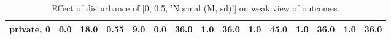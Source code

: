 \begin{table}
\begin{tabular}{l|cc|cc|cc|cc|cc|cc|cc}
private, 0 & \cellcolor{Bittersweet}0.0&\cellcolor{Bittersweet}18.0&\cellcolor{Bittersweet}0.55&\cellcolor{Bittersweet}9.0&\cellcolor{Bittersweet}0.0&\cellcolor{Bittersweet}36.0&\cellcolor{Bittersweet}1.0&\cellcolor{Bittersweet}36.0&\cellcolor{Bittersweet}1.0&\cellcolor{Bittersweet}45.0&\cellcolor{Bittersweet}1.0&\cellcolor{Bittersweet}36.0&\cellcolor{Bittersweet}1.0&\cellcolor{Bittersweet}36.0\\\bottomrule\end{tabular}\caption{Effect of disturbance of [0, 0.5, 'Normal (M, sd)'] on weak view of outcomes.}\end{table}